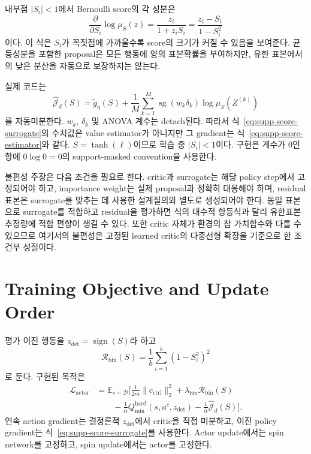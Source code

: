 \documentclass[10pt,journal]{IEEEtran}
\newcommand{\E}{\mathbb{E}}
\newcommand{\sg}{\operatorname{sg}}
\begin{document}
내부점 $|S_i|<1$에서 Bernoulli score의 각 성분은
\begin{equation}
\frac{\partial}{\partial S_i}\log\mu_S(z)
=\frac{z_i}{1+z_iS_i}
=\frac{z_i-S_i}{1-S_i^2}
\label{eq:supp-bernoulli-score}
\end{equation}
이다. 이 식은 $S_i$가 꼭짓점에 가까울수록 score의 크기가 커질 수 있음을 보여준다. 균등성분을 포함한 proposal은 모든 행동에 양의 표본확률을 부여하지만, 유한 표본에서의 낮은 분산을 자동으로 보장하지는 않는다.

실제 코드는
\begin{equation}
\widehat{\mathcal J}_d(S)=
\widetilde g_\eta(S)+\frac1M\sum_{k=1}^{M}
\sg(w_k\delta_k)\log\mu_S(Z^{(k)})
\label{eq:supp-score-surrogate}
\end{equation}
를 자동미분한다. $w_k$, $\delta_k$ 및 ANOVA 계수는 detach된다. 따라서 식~\eqref{eq:supp-score-surrogate}의 수치값은 value estimator가 아니지만 그 gradient는 식~\eqref{eq:supp-score-estimator}와 같다. $S=\tanh(\ell)$이므로 학습 중 $|S_i|<1$이다. 구현은 계수가 0인 항에 $0\log0=0$의 support-masked convention을 사용한다.

불편성 주장은 다음 조건을 필요로 한다. critic과 surrogate는 해당 policy step에서 고정되어야 하고, importance weight는 실제 proposal과 정확히 대응해야 하며, residual 표본은 surrogate를 맞추는 데 사용한 설계질의와 별도로 생성되어야 한다. 동일 표본으로 surrogate를 적합하고 residual을 평가하면 식의 대수적 항등식과 달리 유한표본 추정량에 적합 편향이 생길 수 있다. 또한 critic 자체가 환경의 참 가치함수와 다를 수 있으므로 여기서의 불편성은 고정된 learned critic의 다중선형 확장을 기준으로 한 조건부 성질이다.

\section{Training Objective and Update Order}
\label{sec:training}

평가 이진 행동을 $z_{\mathrm{det}}=\operatorname{sign}(S)$라 하고
\begin{equation}
\mathcal R_{\mathrm{bin}}(S)=\frac1b\sum_{i=1}^{b}(1-S_i^2)^2
\end{equation}
로 둔다. 구현된 목적은
\begin{align}
\mathcal L_{\mathrm{actor}}
&=\E_{s\sim\mathcal D}\Bigg[
\frac{1}{2m}\|c_{\mathrm{ctrl}}\|_2^2
+\lambda_{\mathrm{bin}}\mathcal R_{\mathrm{bin}}(S)
\nonumber\\
&\qquad-\frac1\alpha Q_{\min}^{\mathrm{hard}}(s,a^c,z_{\mathrm{det}})
-\frac1\alpha\widehat{\mathcal J}_d(S)\Bigg].
\end{align}
연속 action gradient는 결정론적 $z_{\mathrm{det}}$에서 critic을 직접 미분하고, 이진 policy gradient는 식~\eqref{eq:supp-score-surrogate}를 사용한다. Actor update에서는 spin network를 고정하고, spin update에서는 actor를 고정한다.
\end{document}
